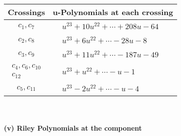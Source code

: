 \documentclass[1p]{elsarticle_modified}
\theoremstyle{definition}
\begin{document}
\begin{tabular}{m{50pt}|m{274pt}}
Crossings & \hspace{64pt}u-Polynomials at each crossing \\
\hline $$\begin{aligned}c_{1},c_{7}\end{aligned}$$&$\begin{aligned}
&u^{23}+10 u^{22}+\cdots+208 u-64
\end{aligned}$\\
\hline $$\begin{aligned}c_{2},c_{8}\end{aligned}$$&$\begin{aligned}
&u^{23}+6 u^{22}+\cdots-28 u-8
\end{aligned}$\\
\hline $$\begin{aligned}c_{3},c_{9}\end{aligned}$$&$\begin{aligned}
&u^{23}+11 u^{22}+\cdots-187 u-49
\end{aligned}$\\
\hline $$\begin{aligned}c_{4},c_{6},c_{10}\\c_{12}\end{aligned}$$&$\begin{aligned}
&u^{23}+u^{22}+\cdots- u-1
\end{aligned}$\\
\hline $$\begin{aligned}c_{5},c_{11}\end{aligned}$$&$\begin{aligned}
&u^{23}-2 u^{22}+\cdots- u-4
\end{aligned}$\\
\hline
\end{tabular}\\~\\
\newpage\renewcommand{\arraystretch}{1}
\flushleft \textbf{(v) Riley Polynomials at the component}\newline \\
\end{document}
